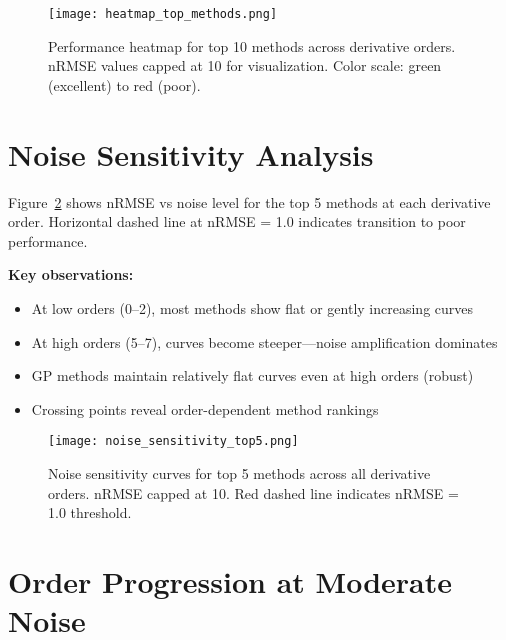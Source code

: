 \documentclass[11pt]{article}
\begin{document}
\begin{figure}[p]
\centering
\texttt{[image: heatmap\_top\_methods.png]}
\caption{Performance heatmap for top 10 methods across derivative orders. nRMSE values capped at 10 for visualization. Color scale: green (excellent) to red (poor).}
\label{fig:heatmap}
\end{figure}

\clearpage


\section{Noise Sensitivity Analysis}

Figure~\ref{fig:noise_sensitivity} shows nRMSE vs noise level for the top 5 methods at each derivative order. Horizontal dashed line at nRMSE = 1.0 indicates transition to poor performance.

\textbf{Key observations:}
\begin{itemize}
    \item At low orders (0--2), most methods show flat or gently increasing curves
    \item At high orders (5--7), curves become steeper---noise amplification dominates
    \item GP methods maintain relatively flat curves even at high orders (robust)
    \item Crossing points reveal order-dependent method rankings
\end{itemize}

\begin{figure}[p]
\centering
\texttt{[image: noise\_sensitivity\_top5.png]}
\caption{Noise sensitivity curves for top 5 methods across all derivative orders. nRMSE capped at 10. Red dashed line indicates nRMSE = 1.0 threshold.}
\label{fig:noise_sensitivity}
\end{figure}

\clearpage


\section{Order Progression at Moderate Noise}
\end{document}
